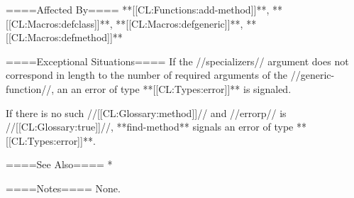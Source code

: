 ====Affected By====
**[[CL:Functions:add-method]]**, **[[CL:Macros:defclass]]**, **[[CL:Macros:defgeneric]]**, **[[CL:Macros:defmethod]]**

====Exceptional Situations====
If the //specializers// argument does not correspond in length to the number of required arguments of the //generic-function//, an an error of type **[[CL:Types:error]]** is signaled.

If there is no such //[[CL:Glossary:method]]// and //errorp// is //[[CL:Glossary:true]]//, **find-method** signals an error of type **[[CL:Types:error]]**.

====See Also====
  * {\secref\SpecializerQualifierAgreement}

====Notes====
None.

